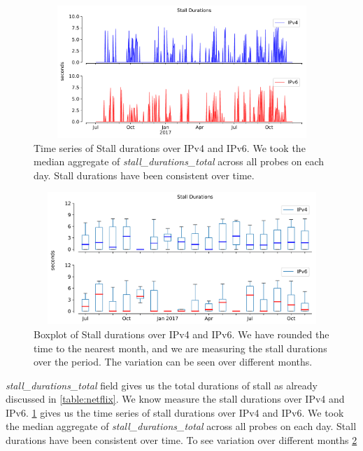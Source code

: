 \begin{figure}[!ht]
	\centering
	\includegraphics[keepaspectratio, height=5cm, width=15cm]{figures/stall/netflix-stall-durations-timeseries-separate.pdf}
	\caption[Stall Duration Timeseries for IPv4 and IPv6]{Time series of Stall durations over IPv4 and IPv6. We took the median aggregate of \textit{stall\_durations\_total} across all probes on each day. Stall durations have been consistent over time.}
	\label{fig:Stall Duration Timeseries for IPv4 and IPv6}
\end{figure}
\begin{figure}[!ht]
	\centering
	\includegraphics[keepaspectratio, height=5cm, width=15cm]{figures/stall/netflix-stall-durations-boxplot.pdf}
	\caption[Stall Duration Boxplot for IPv4 and IPv6]{Boxplot of Stall durations over IPv4 and IPv6. We have rounded the time to the nearest month, and we are measuring the stall durations over the period. The variation can be seen over different months.}
	\label{fig:Stall Duration Boxplot for IPv4 and IPv6}
\end{figure}
\textit{stall\_durations\_total} field gives us the total durations of stall as already discussed in \cref{table:netflix}. We know measure the stall durations over IPv4 and IPv6. \cref{fig:Stall Duration Timeseries for IPv4 and IPv6}
gives us the time series of stall durations over IPv4 and IPv6. We took the median aggregate of \textit{stall\_durations\_total} across all probes on each day. Stall durations have been consistent over time. To see variation over different months \cref{fig:Stall Duration Boxplot for IPv4 and IPv6}
